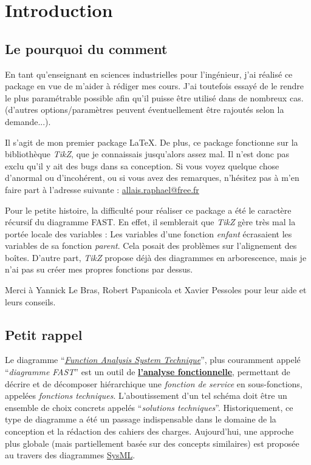 \section{Introduction}\label{intro}

	\subsection{Le pourquoi du comment}\label{auteur}

		En tant qu'enseignant en sciences industrielles pour l'ingénieur, j'ai réalisé ce package en vue de m'aider à rédiger mes cours.
		J'ai toutefois essayé de le rendre le plus paramétrable possible afin qu'il puisse être utilisé dans de nombreux cas.
		(d'autres options/paramètres peuvent éventuellement être rajoutés selon la demande...).

		Il s'agit de mon premier package \LaTeX.
		De plus, ce package fonctionne sur la bibliothèque \emph{TikZ}, que je connaissais jusqu'alors assez mal.
		Il n'est donc pas exclu qu'il y ait des bugs dans sa conception.
		Si vous voyez quelque chose d'anormal ou d'incohérent, ou si vous avez des remarques, n'hésitez pas à m'en faire part à l'adresse suivante :
		\href{mailto:allais.raphael@free.fr}{allais.raphael@free.fr}
		
		Pour le petite histoire, la difficulté pour réaliser ce package a été le caractère récursif du diagramme FAST.
		En effet, il semblerait que \emph{TikZ} gère très mal la portée locale des variables :
		Les variables d'une fonction \emph{enfant} écrasaient les variables de sa fonction \emph{parent}.
		Cela posait des problèmes sur l'alignement des boîtes.
		D'autre part, \emph{TikZ} propose déjà des diagrammes en arborescence, mais je n'ai pas su créer mes propres fonctions par dessus.

		Merci à Yannick Le Bras, Robert Papanicola et Xavier Pessoles pour leur aide et leurs conseils.


	\subsection{Petit rappel}\label{rappel}
		Le diagramme ``\emph{\href{http://fr.wikipedia.org/wiki/Function_Analysis_System_Technique}{Function Analysis System Technique}}'', plus couramment appelé ``\emph{diagramme FAST}''
		est un outil de \textbf{\href{http://fr.wikipedia.org/wiki/Analyse_fonctionnelle_\%28conception\%29}{l'analyse fonctionnelle}},
		permettant de décrire et de décomposer hiérarchique une \emph{fonction de service} en sous-fonctions, appelées \emph{fonctions techniques}.
		L'aboutissement d'un tel schéma doit être un ensemble de choix concrets appelés ``\emph{solutions techniques}''.
		Historiquement, ce type de diagramme a été un passage indispensable dans le domaine de la conception et la rédaction des cahiers des charges.
		Aujourd'hui, une approche plus globale (mais partiellement basée sur des concepts similaires) est proposée au travers des diagrammes \href{http://fr.wikipedia.org/wiki/Systems_Modeling_Language}{SysML}.

